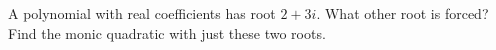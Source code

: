 A polynomial with real coefficients has root $2+3i$. What other root is forced? Find the monic quadratic with just these two roots.
